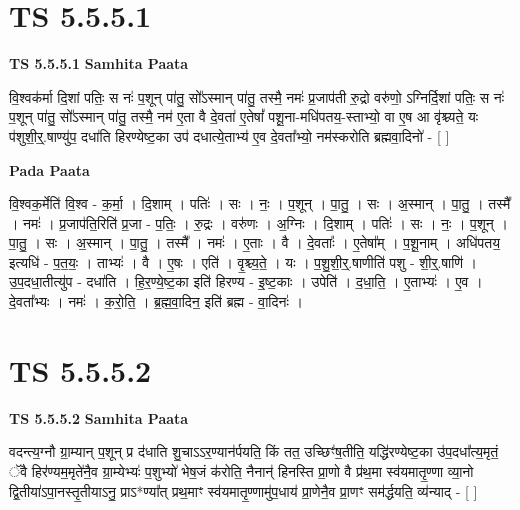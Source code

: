 \documentclass[17pt]{extarticle}
\begin{document}

\section{ TS 5.5.5.1 }

\textbf{TS 5.5.5.1 } \newline
\textbf{Samhita Paata} \newline

वि॒श्वक॑र्मा दि॒शां पतिः॒ स नः॑ प॒शून् पा॑तु॒ सो᳚ऽस्मान् पा॑तु॒ तस्मै॒ नमः॑ प्र॒जाप॑ती रु॒द्रो वरु॑णो॒ ऽग्निर्दि॒शां पतिः॒ स नः॑ प॒शून् पा॑तु॒ सो᳚ऽस्मान् पा॑तु॒ तस्मै॒ नम॑ ए॒ता वै दे॒वता॑ ए॒तेषां᳚ पशू॒ना-मधि॑पतय॒-स्ताभ्यो॒ वा ए॒ष आ वृ॑श्च्यते॒ यः प॑शुशी॒र्॒.षाण्यु॑प॒ दधा॑ति हिरण्येष्ट॒का उप॑ दधात्ये॒ताभ्य॑ ए॒व दे॒वता᳚भ्यो॒ नम॑स्करोति ब्रह्मवा॒दिनो॑ - [  ] \newline

\textbf{Pada Paata} \newline

वि॒श्वक॒र्मेति॑ वि॒श्व - क॒र्मा॒ । दि॒शाम् । पतिः॑ । सः । नः॒ । प॒शून् । पा॒तु॒ । सः । अ॒स्मान् । पा॒तु॒ । तस्मै᳚ । नमः॑ । प्र॒जाप॑ति॒रिति॑ प्र॒जा - प॒तिः॒ । रु॒द्रः । वरु॑णः । अ॒ग्निः । दि॒शाम् । पतिः॑ । सः । नः॒ । प॒शून् । पा॒तु॒ । सः । अ॒स्मान् । पा॒तु॒ । तस्मै᳚ । नमः॑ । ए॒ताः । वै । दे॒वताः᳚ । ए॒तेषा᳚म् । प॒शू॒नाम् । अधि॑पतय॒ इत्यधि॑ - प॒त॒यः॒ । ताभ्यः॑ । वै । ए॒षः । एति॑ । वृ॒श्च्य॒ते॒ । यः । प॒शु॒शी॒र्॒.षाणीति॑ पशु - शी॒र्॒.षाणि॑ । उ॒प॒दधा॒तीत्यु॑प - दधा॑ति । हि॒र॒ण्ये॒ष्ट॒का इति॑ हिरण्य - इ॒ष्ट॒काः । उपेति॑ । द॒धा॒ति॒ । ए॒ताभ्यः॑ । ए॒व । दे॒वता᳚भ्यः । नमः॑ । क॒रो॒ति॒ । ब्र॒ह्म॒वा॒दिन॒ इति॑ ब्रह्म - वा॒दिनः॑ ।  \newline





\section{ TS 5.5.5.2 }

\textbf{TS 5.5.5.2 } \newline
\textbf{Samhita Paata} \newline

वदन्त्य॒ग्नौ ग्रा॒म्यान् प॒शून् प्र द॑धाति शु॒चाऽऽर॒ण्यान॑र्पयति॒ किं तत॒ उच्छिꣳ॑ष॒तीति॒ यद्धि॑रण्येष्ट॒का उ॑प॒दधा᳚त्य॒मृतं॒ ॅवै हिर॑ण्यम॒मृते॑नै॒व ग्रा॒म्येभ्यः॑ प॒शुभ्यो॑ भेष॒जं क॑रोति॒ नैनान्॑ हिनस्ति प्रा॒णो वै प्र॑थ॒मा स्व॑यमातृ॒ण्णा व्या॒नो द्वि॒तीया॑ऽपा॒नस्तृ॒तीयाऽनु॒ प्राऽ*ण्या᳚त् प्रथ॒माꣳ स्व॑यमातृ॒ण्णामु॑प॒धाय॑ प्रा॒णेनै॒व प्रा॒णꣳ सम॑र्द्धयति॒ व्य॑न्याद् - [  ] \newline
\end{document}
